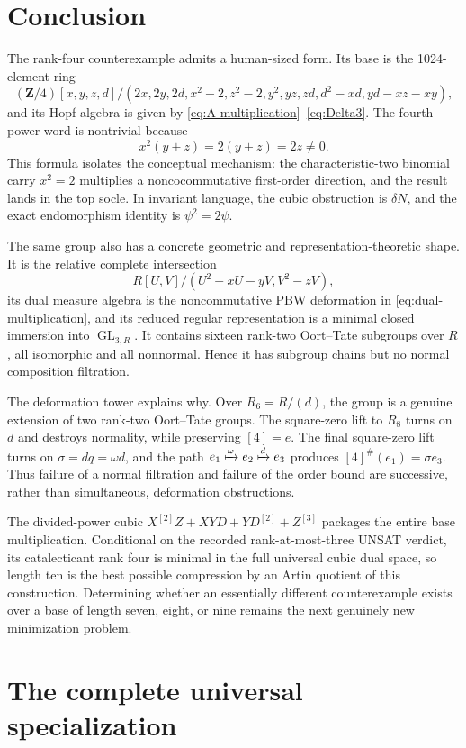 \documentclass[11pt]{article}
\theoremstyle{remark}
\newcommand{\Z}{\mathbf Z}
\newcommand{\GL}{\operatorname{GL}}
\begin{document}
\section{Conclusion}

The rank-four counterexample admits a human-sized form.  Its base is the
1024-element ring
\[
(\Z/4)[x,y,z,d]/
(2x,2y,2d,x^2-2,z^2-2,y^2,yz,zd,d^2-xd,yd-xz-xy),
\]
and its Hopf algebra is given by
\eqref{eq:A-multiplication}--\eqref{eq:Delta3}.  The fourth-power word is
nontrivial because
\[
 x^2(y+z)=2(y+z)=2z\ne0.
\]
This formula isolates the conceptual mechanism: the characteristic-two
binomial carry \(x^2=2\) multiplies a noncocommutative first-order direction,
and the result lands in the top socle.  In invariant language, the cubic
obstruction is \(\delta N\), and the exact endomorphism identity is
\(\psi^2=2\psi\).

The same group also has a concrete geometric and representation-theoretic
shape.  It is the relative complete intersection
\[
 R[U,V]/(U^2-xU-yV,V^2-zV),
\]
its dual measure algebra is the noncommutative PBW deformation in
\eqref{eq:dual-multiplication}, and its reduced regular representation is a
minimal closed immersion into \(\GL_{3,R}\).  It contains sixteen rank-two
Oort--Tate subgroups over \(R\), all isomorphic and all nonnormal.  Hence it
has subgroup chains but no normal composition filtration.

The deformation tower explains why.  Over \(R_6=R/(d)\), the group is a
genuine extension of two rank-two Oort--Tate groups.  The square-zero lift
to \(R_8\) turns on \(d\) and destroys normality, while preserving
\([4]=e\).  The final square-zero lift turns on
\(\sigma=dq=\omega d\), and the path
\(e_1\xmapsto{\omega}e_2\xmapsto{d}e_3\) produces
\([4]^\#(e_1)=\sigma e_3\).  Thus failure of a normal filtration and failure
of the order bound are successive, rather than simultaneous, deformation
obstructions.

The divided-power cubic
\(X^{[2]}Z+XYD+YD^{[2]}+Z^{[3]}\) packages the entire base multiplication.
Conditional on the recorded rank-at-most-three UNSAT verdict, its
catalecticant rank four is minimal in the full universal cubic dual space,
so length ten is the best possible compression by an Artin quotient of this
construction.  Determining whether an essentially
different counterexample exists over a base of length seven, eight, or nine
remains the next genuinely new minimization problem.

\appendix

\section{The complete universal specialization}\label{app:specialization}
\end{document}
